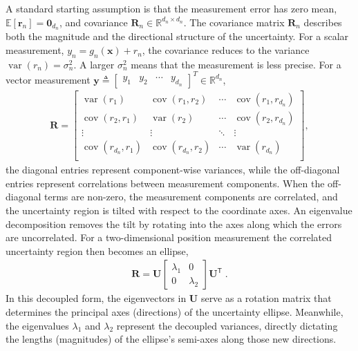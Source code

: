 \documentclass[11pt,oneside,openany]{book}
\begin{document}
A standard starting assumption is that the measurement error has zero mean, $\mathbb{E}[\mathbf{r}_n]=\mathbf{0}_{d_n}$, and covariance $\mathbf{R}_n\in\mathbb{R}^{d_n\times d_n}$. The covariance matrix $\mathbf{R}_n$ describes both the magnitude and the directional structure of the uncertainty. For a scalar measurement, $y_n=g_n(\mathbf{x})+r_n$, the covariance reduces to the variance $\operatorname{var}(r_n)=\sigma_n^2$. A larger $\sigma_n^2$ means that the measurement is less precise. For a vector measurement $\mathbf{y}\triangleq \begin{bmatrix} y_{1} & y_{2} & \cdots & y_{d_n} \end{bmatrix}^T \in \mathbb{R}^{d_n}$,
\begin{align*}
\mathbf{R}=
\begin{bmatrix}
\operatorname{var}(r_{1}) & \operatorname{cov}(r_{1},r_{2}) & \cdots & \operatorname{cov}(r_{1},r_{d_n})\\
\operatorname{cov}(r_{2},r_{1}) & \operatorname{var}(r_{2}) & \cdots & \operatorname{cov}(r_{2},r_{d_n}) \\
\vdots & \vdots & \ddots & \vdots\\
\operatorname{cov}(r_{d_n},r_{1})  & \operatorname{cov}(r_{d_n},r_{2}) & \cdots & \operatorname{var}(r_{d_n}) \\
\end{bmatrix},
\end{align*}
the diagonal entries represent component-wise variances, while the off-diagonal entries represent correlations between measurement components. When the off-diagonal terms are non-zero, the measurement components are correlated, and the uncertainty region is tilted with respect to the coordinate axes. An eigenvalue decomposition removes the tilt by rotating into the axes along which the errors are uncorrelated. For a two-dimensional position measurement
the correlated uncertainty region then becomes an ellipse,
\begin{align*}
\mathbf{R}=\mathbf{U}\left[\begin{matrix}\lambda _{1}&0\\ 0&\lambda _{2}\end{matrix}\right]\mathbf{U}^{\mathsf{T}} \;.
\end{align*}
In this decoupled form, the eigenvectors in $\mathbf{U}$ serve as a rotation matrix that determines the principal axes (directions) of the uncertainty ellipse. Meanwhile, the eigenvalues $\lambda _{1}$ and $\lambda _{2}$ represent the decoupled variances, directly dictating the lengths (magnitudes) of the ellipse's semi-axes along those new directions.
\end{document}
